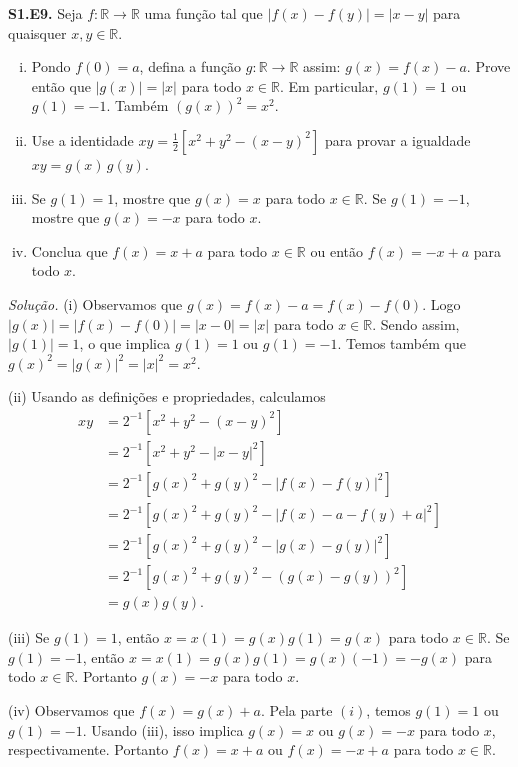 \documentclass[a4paper,11pt]{article}
\newcommand{\R}{\mathbb{R}}
\begin{document}
\textbf{S1.E9.}
Seja $f : \R \to \R$ uma função tal que $|f(x)-f(y)| = |x-y|$ para quaisquer $x,y \in \R$.
\begin{enumerate}[(i)]
  \item
    Pondo $f(0) = a$, defina a função $g : \R \to \R$ assim: $g(x) = f(x) - a$.
    Prove então que $|g(x)| = |x|$ para todo $x \in \R$.
    Em particular, $g(1) = 1$ ou $g(1) = -1$.
    Também $(g(x))^2 = x^2$.
  \item
    Use a identidade $xy = \frac{1}{2}[ x^2 + y^2 - (x-y)^2 ]$ para provar a igualdade $xy = g(x)\,g(y)$.
  \item
    Se $g(1) = 1$, mostre que $g(x) = x$ para todo $x \in \R$.
    Se $g(1) = -1$, mostre que $g(x) = -x$ para todo $x$.
  \item
    Conclua que $f(x) = x + a$ para todo $x \in \R$ ou então $f(x) = -x + a$ para todo $x$.
\end{enumerate}

\vspace{\baselineskip}

\emph{Solução.}
(i)
Observamos que $g(x) = f(x) - a = f(x) - f(0)$.
Logo $|g(x)| = |f(x)-f(0)| = |x-0| = |x|$ para todo $x \in \R$.
Sendo assim, $|g(1)| = 1$, o que implica $g(1) = 1$ ou $g(1) = -1$.
Temos também que $g(x)^2 = |g(x)|^2 = |x|^2 = x^2$.

(ii)
Usando as definições e propriedades, calculamos
\begin{align*}
  xy & = 2^{-1} [x^2 + y^2 - (x-y)^2 ] \\
  & = 2^{-1} [ x^2 + y^2 - |x-y|^2 ] \\
  & = 2^{-1} [ g(x)^2 + g(y)^2 - |f(x) - f(y)|^2 ] \\
  & = 2^{-1} [ g(x)^2 + g(y)^2 - |f(x) - a - f(y) + a|^2 ] \\
  & = 2^{-1} [ g(x)^2 + g(y)^2 - |g(x) - g(y)|^2 ] \\
  & = 2^{-1} [ g(x)^2 + g(y)^2 - (g(x) - g(y))^2 ] \\
  & = g(x)g(y).
\end{align*}

(iii)
Se $g(1)=1$, então $x = x(1) = g(x)g(1) = g(x)$ para todo $x \in \R$.
Se $g(1)=-1$, então $x = x(1) = g(x)g(1) = g(x)(-1) = -g(x)$ para todo $x \in \R$.
Portanto $g(x) = -x$ para todo $x$.

(iv)
Observamos que $f(x) = g(x) + a$.
Pela parte $(i)$, temos $g(1) = 1$ ou $g(1) = -1$.
Usando (iii), isso implica $g(x)=x$ ou $g(x) = -x$ para todo $x$, respectivamente.
Portanto $f(x) = x + a$ ou $f(x) = -x + a$ para todo $x \in \R$.
\end{document}
